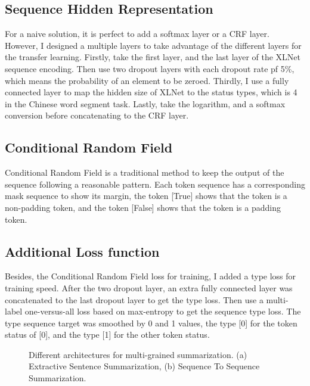 \documentclass[11pt,a4paper]{article}
\begin{document}
\subsection{Sequence Hidden Representation}

For a naive solution, it is perfect to add a softmax layer or a CRF layer.
However, I designed a multiple layers to take advantage of the different layers for the transfer learning.
Firstly, take the first layer, and the last layer of the XLNet sequence encoding.
Then use two dropout layers with each dropout rate pf 5\%, which means the probability of an element to be zeroed.
Thirdly, I use a fully connected layer to map the hidden size of XLNet to the status types, which is 4 in the Chinese word segment task.
Lastly, take the logarithm, and a softmax conversion before concatenating to the CRF layer.


\subsection{Conditional Random Field}

Conditional Random Field is a traditional method to keep the output of the sequence following a reasonable pattern.
Each token sequence has a corresponding mask sequence to show its margin, the token [True] shows that the token is a non-padding token,
and the token [False] shows that the token is a padding token.

\subsection{Additional Loss function}

Besides, the Conditional Random Field loss for training, I added a type loss for training speed.
After the two dropout layer, an extra fully connected layer was concatenated to the last dropout layer to get the type loss.
Then use a multi-label one-versus-all loss based on max-entropy to get the sequence type loss.
The type sequence target was smoothed by 0 and 1 values, the type [0] for the token status of [0], and the type [1] for the other token status.

\begin{figure*}
\begin{center}
\end{center}
   \caption{Different architectures for multi-grained summarization.
   (a) Extractive Sentence Summarization,
   (b) Sequence To Sequence Summarization.}
\label{fig:short}
\end{figure*}
\end{document}
